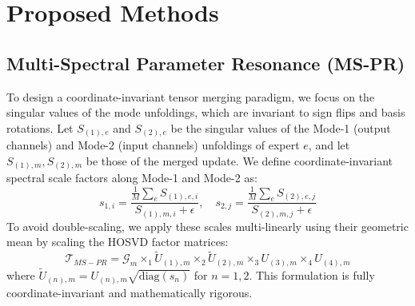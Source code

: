 \documentclass{article}
\theoremstyle{plain}
\theoremstyle{definition}
\theoremstyle{remark}
\begin{document}
\section{Proposed Methods}

\subsection{Multi-Spectral Parameter Resonance (MS-PR)}
To design a coordinate-invariant tensor merging paradigm, we focus on the singular values of the mode unfoldings, which are invariant to sign flips and basis rotations.
Let $S_{(1), e}$ and $S_{(2), e}$ be the singular values of the Mode-1 (output channels) and Mode-2 (input channels) unfoldings of expert $e$, and let $S_{(1), m}, S_{(2), m}$ be those of the merged update. We define coordinate-invariant spectral scale factors along Mode-1 and Mode-2 as:
\begin{equation}
    s_{1, i} = \frac{\frac{1}{M}\sum_e S_{(1), e, i}}{S_{(1), m, i} + \epsilon}, \quad s_{2, j} = \frac{\frac{1}{M}\sum_e S_{(2), e, j}}{S_{(2), m, j} + \epsilon}
\end{equation}
To avoid double-scaling, we apply these scales multi-linearly using their geometric mean by scaling the HOSVD factor matrices:
\begin{equation}
    \mathcal{T}_{MS-PR} = \mathcal{G}_m \times_1 \widetilde{U}_{(1), m} \times_2 \widetilde{U}_{(2), m} \times_3 U_{(3), m} \times_4 U_{(4), m}
\end{equation}
where $\widetilde{U}_{(n), m} = U_{(n), m} \sqrt{\text{diag}(s_n)}$ for $n=1,2$.
This formulation is fully coordinate-invariant and mathematically rigorous.
\end{document}
